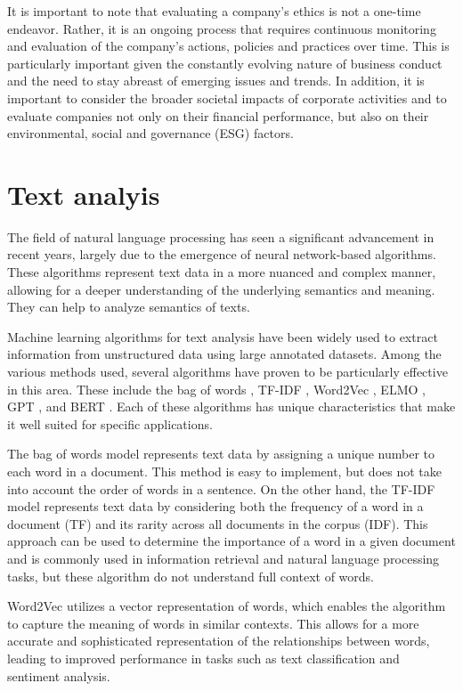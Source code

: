 \documentclass[PI]{ProjectProposal}
\begin{document}
It is important to note that evaluating a company's ethics is not a one-time endeavor. Rather, it is an ongoing process that requires continuous monitoring and evaluation of the company's actions, policies and practices over time. This is particularly important given the constantly evolving nature of business conduct and the need to stay abreast of emerging issues and trends. In addition, it is important to consider the broader societal impacts of corporate activities and to evaluate companies not only on their financial performance, but also on their environmental, social and governance (ESG) factors.
\section{Text analyis}
\label{sec:org6f7978e}
The field of natural language processing has seen a significant advancement in recent years, largely due to the emergence of neural network-based algorithms. These algorithms represent text data in a more nuanced and complex manner, allowing for a deeper understanding of the underlying semantics and meaning. They can help to analyze semantics of texts.

Machine learning algorithms for text analysis have been widely used to extract information from unstructured data using large annotated datasets. Among the various methods used, several algorithms have proven to be particularly effective in this area. These include the bag of words \autocite{doi:10.1080/00437956.1954.11659520}, TF-IDF \autocite{jones1972statistical}, Word2Vec\autocite{mikolov2013distributed} , ELMO \autocite{elmo}, GPT \autocite{radford2019language}, and BERT \autocite{devlin2018bert}. Each of these algorithms has unique characteristics that make it well suited for specific applications.

The bag of words model represents text data by assigning a unique number to each word in a document. This method is easy to implement, but does not take into account the order of words in a sentence. On the other hand, the TF-IDF model represents text data by considering both the frequency of a word in a document (TF) and its rarity across all documents in the corpus (IDF). This approach can be used to determine the importance of a word in a given document and is commonly used in information retrieval and natural language processing tasks, but these algorithm do not understand full context of words.

Word2Vec utilizes a vector representation of words, which enables the algorithm to capture the meaning of words in similar contexts. This allows for a more accurate and sophisticated representation of the relationships between words, leading to improved performance in tasks such as text classification and sentiment analysis.
\end{document}
